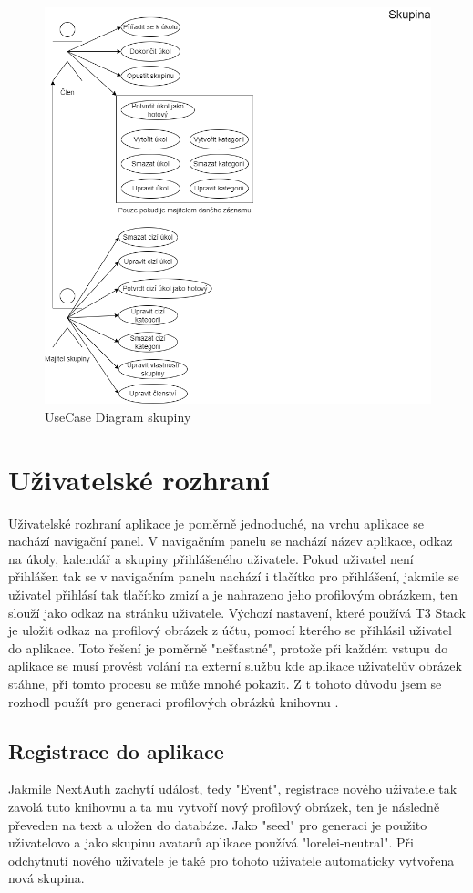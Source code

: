 \begin{figure}[hbt!]
	\includegraphics[width=1\linewidth]{img/UseCaseSkupina.png}
	\caption{UseCase Diagram skupiny}
\end{figure}
\clearpage
\section{Uživatelské rozhraní}
Uživatelské rozhraní aplikace je poměrně jednoduché, na vrchu aplikace se nachází navigační panel. V navigačním panelu se nachází název aplikace, odkaz na úkoly, kalendář a skupiny přihlášeného uživatele. Pokud uživatel není přihlášen tak se v navigačním panelu nachází i tlačítko pro přihlášení, jakmile se uživatel přihlásí tak tlačítko zmizí a je nahrazeno jeho profilovým obrázkem, ten slouží jako odkaz na stránku uživatele. Výchozí nastavení, které používá T3 Stack je uložit odkaz na profilový obrázek z účtu, pomocí kterého se přihlásil uživatel do aplikace. Toto řešení je poměrně "nešťastné", protože při každém vstupu do aplikace se musí provést volání na externí službu kde aplikace uživatelův obrázek stáhne, při tomto procesu se může mnohé pokazit. Z t tohoto důvodu jsem se rozhodl použít pro generaci profilových obrázků knihovnu \cite{dicebear}.

\subsection{Registrace do aplikace}
Jakmile NextAuth zachytí událost, tedy "Event", registrace nového uživatele tak zavolá tuto knihovnu a ta mu vytvoří nový profilový obrázek, ten je následně převeden na text a uložen do databáze. Jako "seed" pro generaci je použito uživatelovo  a jako skupinu avatarů aplikace používá "lorelei-neutral"\cite{lorelei-neutral}. Při odchytnutí nového uživatele je také pro tohoto uživatele automaticky vytvořena nová skupina.

